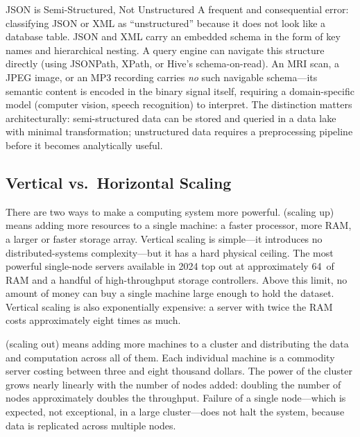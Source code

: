 \begin{caution}{JSON is Semi-Structured, Not Unstructured}
A frequent and consequential error: classifying JSON or XML as
``unstructured'' because it does not look like a database table. JSON
and XML carry an embedded schema in the form of key names and
hierarchical nesting. A query engine can navigate this structure
directly (using JSONPath, XPath, or Hive's schema-on-read). An MRI
scan, a JPEG image, or an MP3 recording carries \emph{no} such
navigable schema---its semantic content is encoded in the binary signal
itself, requiring a domain-specific model (computer vision, speech
recognition) to interpret. The distinction matters architecturally:
semi-structured data can be stored and queried in a data lake with
minimal transformation; unstructured data requires a preprocessing
pipeline before it becomes analytically useful.
\end{caution}
\subsection{Vertical vs.\ Horizontal Scaling}
\label{subsec:scaling}

There are two ways to make a computing system more powerful.
 (scaling up) means adding more resources to a
single machine: a faster processor, more RAM, a larger or faster storage
array. Vertical scaling is simple---it introduces no distributed-systems
complexity---but it has a hard physical ceiling. The most powerful
single-node servers available in 2024 top out at approximately 64\TB\
of RAM and a handful of high-throughput storage controllers. Above this
limit, no amount of money can buy a single machine large enough to hold
the dataset. Vertical scaling is also exponentially expensive: a server
with twice the RAM costs approximately eight times as much.

 (scaling out) means adding more machines to a
cluster and distributing the data and computation across all of them.
Each individual machine is a commodity server costing between three and
eight thousand dollars. The power of the cluster grows nearly linearly
with the number of nodes added: doubling the number of nodes
approximately doubles the throughput. Failure of a single node---which
is expected, not exceptional, in a large cluster---does not halt the
system, because data is replicated across multiple nodes.

